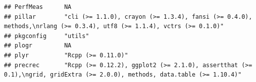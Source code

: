 \documentclass[]{article}
\begin{document}
\begin{verbatim}
## PerfMeas      NA                                                                                                                                                                                                                                                                                                                                                                                                                                                                                    
## pillar        "cli (>= 1.1.0), crayon (>= 1.3.4), fansi (>= 0.4.0), methods,\nrlang (>= 0.3.4), utf8 (>= 1.1.4), vctrs (>= 0.1.0)"                                                                                                                                                                                                                                                                                                                                                                  
## pkgconfig     "utils"                                                                                                                                                                                                                                                                                                                                                                                                                                                                               
## plogr         NA                                                                                                                                                                                                                                                                                                                                                                                                                                                                                    
## plyr          "Rcpp (>= 0.11.0)"                                                                                                                                                                                                                                                                                                                                                                                                                                                                    
## precrec       "Rcpp (>= 0.12.2), ggplot2 (>= 2.1.0), assertthat (>= 0.1),\ngrid, gridExtra (>= 2.0.0), methods, data.table (>= 1.10.4)"                                                                                                                                                                                                                                                                                                                                                             

\end{verbatim}
\end{document}
